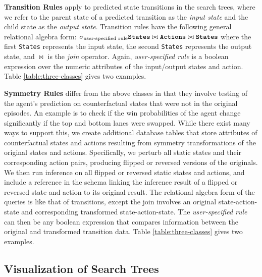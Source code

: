 \documentclass[letterpaper]{article} %
\begin{document}
\textbf{Transition Rules} apply to predicted state transitions in the search trees, where we refer to the parent state of a predicted transition as the \emph{input state} and the child state as the \emph{output state}. Transition rules have the following general relational algebra form:
$\sigma_{\textnormal{user-specified rule}} \textnormal{\texttt{\textbf{States}}}
\bowtie
\textnormal{\texttt{\textbf{Actions}}}
\bowtie
\textnormal{\texttt{\textbf{States}}}$
where the first \texttt{States} represents the input state, the second \texttt{States} represents the output state, and $\bowtie$ is the \textit{join} operator. Again, \emph{user-specified rule} is a boolean expression over the numeric attributes of the input/output states and action. Table \ref{table:three-classes} gives two examples.

\textbf{Symmetry Rules} differ from the above classes in that they involve testing of the agent's prediction on counterfactual states that were not in the original episodes. An example is to check if the win probabilities of the agent change significantly if the top and bottom lanes were swapped. While there exist many ways to support this, we create additional database tables that store attributes of counterfactual states and actions resulting from symmetry transformations of the original states and actions.
Specifically, we perturb all static states and their corresponding action pairs, producing flipped or reversed versions of the originals. We then run inference on all flipped or reversed static states and actions, and include a reference in the schema linking the inference result of a flipped or reversed state and action to its original result. 
The relational algebra form of the queries is like that of transitions, except the join involves an original state-action-state and corresponding transformed state-action-state. The \emph{user-specified rule} can then be any boolean expression that compares information between the original and transformed transition data. Table \ref{table:three-classes} gives two examples.

\subsection{Visualization of Search Trees}
\end{document}
